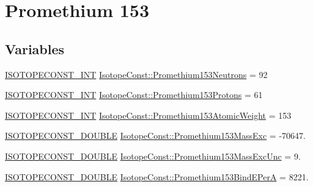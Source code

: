 \hypertarget{group___isotope_const-_promethium-_pm153}{}\section{Promethium 153}
\label{group___isotope_const-_promethium-_pm153}
\subsection*{Variables}
\begin{DoxyCompactItemize}
\item 
\mbox{\hyperlink{group___isotope_const-_macros_ga5f18360b3e99483a35c32d789e62621c}{I\+S\+O\+T\+O\+P\+E\+C\+O\+N\+S\+T\+\_\+\+I\+NT}} \mbox{\hyperlink{group___isotope_const-_promethium-_pm153_ga2d744fd2df1bf849942c740fd5ccceee}{Isotope\+Const\+::\+Promethium153\+Neutrons}} = 92
\item 
\mbox{\hyperlink{group___isotope_const-_macros_ga5f18360b3e99483a35c32d789e62621c}{I\+S\+O\+T\+O\+P\+E\+C\+O\+N\+S\+T\+\_\+\+I\+NT}} \mbox{\hyperlink{group___isotope_const-_promethium-_pm153_ga9306c714d619396d9aa2ebdd82889d35}{Isotope\+Const\+::\+Promethium153\+Protons}} = 61
\item 
\mbox{\hyperlink{group___isotope_const-_macros_ga5f18360b3e99483a35c32d789e62621c}{I\+S\+O\+T\+O\+P\+E\+C\+O\+N\+S\+T\+\_\+\+I\+NT}} \mbox{\hyperlink{group___isotope_const-_promethium-_pm153_ga35703e0ea6e2e5a612bd7a9810e7461f}{Isotope\+Const\+::\+Promethium153\+Atomic\+Weight}} = 153
\item 
\mbox{\hyperlink{group___isotope_const-_macros_ga8f45a7272ce02c0b4c65c44636ed719a}{I\+S\+O\+T\+O\+P\+E\+C\+O\+N\+S\+T\+\_\+\+D\+O\+U\+B\+LE}} \mbox{\hyperlink{group___isotope_const-_promethium-_pm153_ga1359965077637bb5e9030277c78695f1}{Isotope\+Const\+::\+Promethium153\+Mass\+Exc}} = -\/70647.
\item 
\mbox{\hyperlink{group___isotope_const-_macros_ga8f45a7272ce02c0b4c65c44636ed719a}{I\+S\+O\+T\+O\+P\+E\+C\+O\+N\+S\+T\+\_\+\+D\+O\+U\+B\+LE}} \mbox{\hyperlink{group___isotope_const-_promethium-_pm153_ga5430dfda308d5706c37c13d2df875a67}{Isotope\+Const\+::\+Promethium153\+Mass\+Exc\+Unc}} = 9.
\item 
\mbox{\hyperlink{group___isotope_const-_macros_ga8f45a7272ce02c0b4c65c44636ed719a}{I\+S\+O\+T\+O\+P\+E\+C\+O\+N\+S\+T\+\_\+\+D\+O\+U\+B\+LE}} \mbox{\hyperlink{group___isotope_const-_promethium-_pm153_ga8227b4a061e8ec3955933fc238d8a99f}{Isotope\+Const\+::\+Promethium153\+Bind\+E\+PerA}} = 8221.

\end{DoxyCompactItemize}
